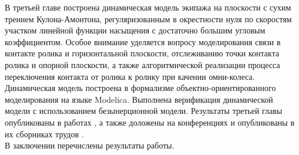 В третьей главе построена динамическая модель экипажа на плоскости с сухим трением Кулона-Амонтона, регуляризованным в окрестности нуля по скоростям участком линейной функции насыщения с достаточно большим угловым коэффициентом. Особое внимание уделяется вопросу моделирования связи в контакте ролика и горизонтальной плоскости, отслеживанию точки контакта ролика и опорной плоскости, а также алгоритмической реализации процесса переключения контакта от ролика к ролику при качении омни-колеса. Динамическая модель построена в формализме объектно-ориентированного моделирования на языке Modelica. Выполнена верификация динамической модели с использованием безынерционной модели. Результаты третьей главы опубликованы в работах \cite{KosenkoGerasimovNd2016,KosenkoGerasimovJsme2016}, а также доложены на конференциях и опубликованы в их сборниках трудов \cite{Kosenko2014unilateral,KosenkoGerasimov2014,Kosenko201construction,Kosenko2015verification,Kosenko2015hierarchy,KosenkoGerasimov2015,Kosenko2016testbench}.\\

В заключении перечислены результаты работы.






